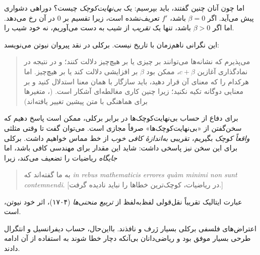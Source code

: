 \documentclass[../../../include/open-logic-section]{subfiles}
\begin{document}
اما چون آنان چنین گفتند، باید بپرسیم: یک \emph{بی‌نهایت‌کوچک} چیست؟
دوراهی دشواری پیش می‌آید. اگر $\beta = 0$ باشد، $f'$ تعریف‌نشده است،
زیرا تقسیم بر $0$ در آن رخ می‌دهد. اما اگر $\beta > 0$ باشد، تنها یک
\emph{تقریب} از شیب به دست می‌آوریم، نه خود شیب را.

این نگرانی ناهم‌زمان با تاریخ نیست. برکلی در نقد پیروان نیوتن می‌نویسد:
\begin{quote}
می‌پذیرم که نشانه‌ها می‌توانند بر چیزی یا بر هیچ‌چیز دلالت کنند؛ و در
نتیجه در نمادگذاری آغازین $c + \beta$، ممکن بود $\beta$ بر افزایشی دلالت
کند یا بر هیچ‌چیز. اما هرکدام را که معنای آن قرار دهید، باید سازگار با
همان معنا استدلال کنید و بر معنایی دوگانه تکیه نکنید؛ زیرا چنین کاری
مغالطه‌ای آشکار است. (\citealt[\S{}XIII]{Berkeley1734}، متغیرها برای
هماهنگی با متن پیشین تغییر یافته‌اند)
\end{quote}
برای دفاع از حساب بی‌نهایت‌کوچک‌ها در برابر برکلی، ممکن است پاسخ دهیم که
سخن‌گفتن از «بی‌نهایت‌کوچک‌ها» صرفاً مجازی است. می‌توان گفت تا وقتی مثلثی
\emph{واقعاً کوچک} بگیریم، تقریبی \emph{به‌اندازهٔ کافی خوب} از خط مماس
خواهیم داشت. برکلی برای این سخن نیز پاسخی داشت: شاید این مقدار برای مهندسی
کافی باشد، اما \emph{جایگاه} ریاضیات را تضعیف می‌کند، زیرا
\begin{quote}
به ما گفته‌اند که \emph{in rebus mathematicis errores qu\`{a}m minimi
non sunt contemnendi}. [در ریاضیات، کوچک‌ترین خطاها را نباید نادیده
گرفت.] \citep[\S{}IX]{Berkeley1734}
\end{quote}
عبارت ایتالیک تقریباً نقل‌قولی لفظ‌به‌لفظ از \emph{تربیع منحنی‌ها}
(۱۷۰۴)، اثر خود نیوتن، است.

اعتراض‌های فلسفی برکلی بسیار ژرف و نافذند. بااین‌حال، حساب دیفرانسیل و
انتگرال طرحی بسیار موفق بود و ریاضی‌دانان بی‌آنکه دچار خطا شوند به
استفاده از آن ادامه دادند.
\end{document}
